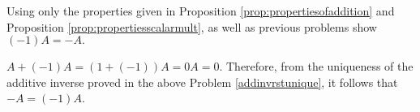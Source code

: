 \begin{enumialphparenastyle}
\begin{ex} Using only the properties given in Proposition \ref{prop:propertiesofaddition} and 
Proposition \ref{prop:propertiesscalarmult}, as well as previous
problems show $\left( -1\right) A=-A.$
\begin{sol}
$A+\left( -1\right) A=\left( 1+\left(
-1\right) \right) A=0A=0.$ Therefore, from the uniqueness of the additive
inverse proved in the above Problem \ref{addinvrstunique}, it follows that $
-A=\left( -1\right) A$.
\end{sol}
\end{ex}

\end{enumialphparenastyle}